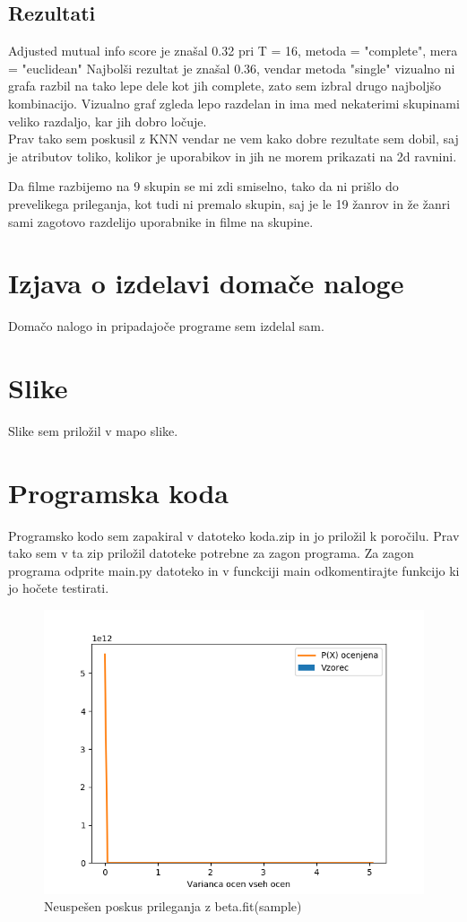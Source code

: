 \documentclass[a4paper,11pt]{article}
\begin{document}
	
	\subsection{Rezultati}
		Adjusted mutual info score je znašal 0.32 pri T = 16, metoda = "complete", mera = "euclidean"
		Najbolši rezultat je znašal 0.36, vendar metoda "single" vizualno ni grafa razbil na tako lepe dele kot jih complete, zato sem izbral drugo najboljšo kombinacijo.
		Vizualno graf zgleda lepo razdelan in ima med nekaterimi skupinami veliko razdaljo, kar jih dobro ločuje. \\
		Prav tako sem poskusil z KNN vendar ne vem kako dobre rezultate sem dobil, saj je atributov toliko, kolikor je uporabikov in  jih ne morem prikazati na 2d ravnini.
		
		Da filme razbijemo na 9 skupin se mi zdi smiselno, tako da ni prišlo do prevelikega prileganja, kot tudi ni premalo skupin, saj je le 19 žanrov in že žanri sami zagotovo razdelijo uporabnike in filme na skupine.


	\section{Izjava o izdelavi domače naloge}
	Domačo nalogo in pripadajoče programe sem izdelal sam.
	
	\appendix
	\appendixpage
	\section{\label{app-res}Slike}
	Slike sem priložil v mapo slike.		
	
		
	\section{\label{app-code}Programska koda}
	Programsko kodo sem zapakiral v datoteko koda.zip in jo priložil k poročilu.
	Prav tako sem v ta zip priložil datoteke potrebne za zagon programa.
	Za zagon programa odprite main.py datoteko in v funckciji main odkomentirajte funkcijo ki jo hočete testirati.


\begin{figure}[!htb]
	\begin{center}
		\includegraphics[scale=1.0]{slike/graph3_fit.png}
		\caption{Neuspešen poskus prileganja z beta.fit(sample)}
		\label{slika3}
	\end{center}
\end{figure}


	
\end{document}
